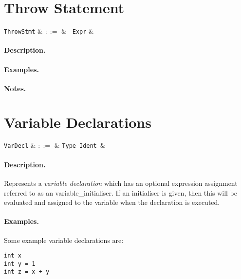 
\section{Throw Statement}

\begin{syntax}
  \verb+ThrowStmt+ & $::=$ & \ \verb+Expr+ &\\
\end{syntax}

\paragraph{Description.}

\paragraph{Examples.}

\paragraph{Notes.} 


\section{Variable Declarations}

\begin{syntax}
  \verb+VarDecl+ & $::=$ & \verb+Type+\ \verb+Ident+\ \big[\
  \token{=}\ \verb+Expr+\ \big]&\\
\end{syntax}

\paragraph{Description.}  Represents a {\em variable declaration}
which has an optional expression assignment referred to as an
\gls{variable_initialiser}.  If an initialiser is given, then this will be evaluated and assigned to the variable when the declaration is executed.

\paragraph{Examples.} Some example variable declarations are:
\begin{lstlisting}
int x
int y = 1
int z = x + y
\end{lstlisting}

